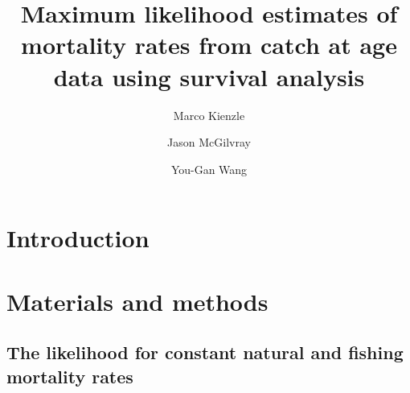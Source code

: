 \documentclass{nrc2}
\begin{document}
\linenumbers
\renewcommand{\baselinestretch}{1.2} %

\title{Maximum likelihood estimates of mortality rates from catch at age data using survival analysis}

\author{Marco Kienzle}
\address[label1]{Queensland Dept of Agriculture, Fisheries and Forestry, Ecosciences Precinct, Joe Baker St, Dutton Park, Brisbane, QLD 4102, Australia; \newline University of Queensland, School of Agriculture and Food Sciences, St. Lucia, QLD 4072, Australia}

\author{Jason McGilvray}
\address[label2]{Queensland Dept of Agriculture, Fisheries and Forestry, Ecosciences Precinct, Joe Baker St, Dutton Park, Brisbane, QLD 4102, Australia}

\author{You-Gan Wang}
\address[label3]{University of Queensland, Centre for Applications in Natural Resource Mathematics, School of Mathematics and Physics, St. Lucia, QLD 4072, Australia}

\begin{abstract}

\end{abstract}

\maketitle


\section{Introduction} 

\section{Materials and methods} 



\subsection{The likelihood for constant natural and fishing mortality rates} 
           
\end{document}

